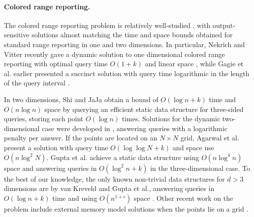 \paragraph*{Colored range reporting.}
%
The colored range reporting problem is relatively well-studied \cite{janardan1993generalized, nekrich2012space, nekrich2013optimal, nekrich2014efficient, gagie2012colored, shi2005optimal, gupta1995further, gupta1997technique, van1992new, mortensen2003generalized, bozanis1995new, larsen2012efficient}, with output-sensitive solutions almost matching the time and space bounds obtained for standard range reporting in one and two dimensions. In particular, Nekrich and Vitter recently gave a dynamic solution to one dimensional colored range reporting with optimal query time $O(1+k)$ and linear space \cite{nekrich2013optimal}, while Gagie et al. earlier presented a succinct solution with query time logarithmic in the length of the query interval \cite{gagie2012colored}.

In two dimensions, Shi and JaJa obtain a bound of $O(\log n + k)$ time and $O(n \log n)$ space \cite{shi2005optimal} by querying an efficient static data structure for three-sided queries, storing each point $O(\log n)$ times. Solutions for the dynamic two-dimensional case were developed in \cite{gupta1995further, bozanis1995new}, answering queries with a logarithmic penalty per answer. If the points are located on an $N \times N$ grid, Agarwal et al. \cite{agarwal2002range} present a solution with query time $O(\log \log N + k)$ and space use $O(n \log ^2 N)$. Gupta et al. achieve a static data structure using $O(n \log ^4 n)$ space and answering queries in $O(\log ^2 n + k)$ \cite{gupta1995further} in the three-dimensional case. To the best of our knowledge, the only known non-trivial data structures for $d> 3$ dimensions are by van Kreveld and Gupta et al., answering queries in $O(\log n + k)$ time and using $O(n^{1+\epsilon})$ space \cite{van1992new, gupta1997technique}. Other recent work on the problem include external memory model solutions when the points lie on a grid \cite{nekrich2012space, larsen2012efficient, nekrich2014efficient}.



